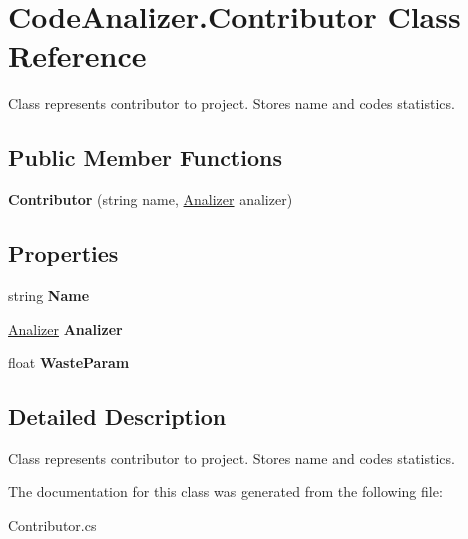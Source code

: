 \hypertarget{class_code_analizer_1_1_contributor}{}\section{Code\+Analizer.\+Contributor Class Reference}
\label{class_code_analizer_1_1_contributor}


Class represents contributor to project. Stores name and codes statistics.  


\subsection*{Public Member Functions}
\begin{DoxyCompactItemize}
\item 
\mbox{\label{class_code_analizer_1_1_contributor_a4d9c84c62b8f85b625e706b7b02cb328}} 
{\bfseries Contributor} (string name, \mbox{\hyperlink{class_code_analizer_1_1_analizer}{Analizer}} analizer)
\end{DoxyCompactItemize}
\subsection*{Properties}
\begin{DoxyCompactItemize}
\item 
\mbox{\label{class_code_analizer_1_1_contributor_a124886b6d64aae7d572ee23255389265}} 
string {\bfseries Name}
\item 
\mbox{\label{class_code_analizer_1_1_contributor_a2e9fa30e46bab8fc0164b3f45c5a47a3}} 
\mbox{\hyperlink{class_code_analizer_1_1_analizer}{Analizer}} {\bfseries Analizer}
\item 
\mbox{\label{class_code_analizer_1_1_contributor_a657e588660828118c773136c1b65df72}} 
float {\bfseries Waste\+Param}
\end{DoxyCompactItemize}


\subsection{Detailed Description}
Class represents contributor to project. Stores name and codes statistics. 



The documentation for this class was generated from the following file\+:\begin{DoxyCompactItemize}
\item 
Contributor.\+cs\end{DoxyCompactItemize}
